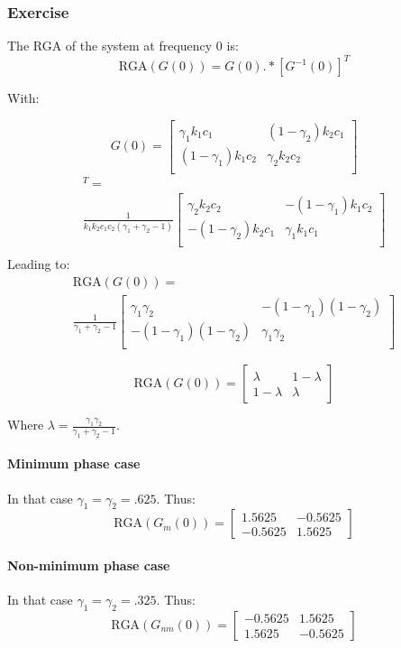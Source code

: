 \subsubsection{Exercise} 

The RGA of the system at frequency 0 is:
$$
\text{RGA}(G(0)) = G(0).\ast[G^{-1}(0)]^T 
$$

With:

\begin{equation*}
    G(0) =
\left[
    \begin{array}{cc}
        \gamma_1k_1c_1 & (1-\gamma_2)k_2c_1 \\
        (1-\gamma_1)k_1c_2 & \gamma_2k_2c_2 \\
    \end{array}
\right]
\end{equation*}
\begin{multline*}
[G^{-1}(0)]^T = \\
\frac{1}{k_1k_2c_1c_2(\gamma_1+\gamma_2-1)}
\left[
    \begin{array}{cc}
        \gamma_2k_2c_2 & -(1-\gamma_1)k_1c_2 \\
        -(1-\gamma_2)k_2c_1 & \gamma_1k_1c_1 \\
    \end{array}
\right]\\
\end{multline*}
Leading to:
\begin{multline*}
    \text{RGA}(G(0)) =\\ 
\frac{1}{\gamma_1+\gamma_2-1}
\left[
    \begin{array}{cc}
        \gamma_1\gamma_2 & -(1-\gamma_1)(1-\gamma_2) \\
        -(1-\gamma_1)(1-\gamma_2) & \gamma_1\gamma_2 \\
    \end{array}
\right]
\end{multline*}

\begin{equation}
    \boxed{
    \text{RGA}(G(0)) =
    \left[
        \begin{array}{cc}
            \lambda & 1 - \lambda \\
            1 - \lambda & \lambda
        \end{array}
    \right]
}
\end{equation}

Where $\lambda = \frac{\gamma_1\gamma_2}{\gamma_1+\gamma_2-1}$.

\paragraph{Minimum phase case}
In that case $\gamma_1 = \gamma_2 = .625$. Thus:
$$
\text{RGA}(G_{m}(0)) =
    \left[
        \begin{array}{cc}
            1.5625 & -0.5625 \\
            -0.5625 & 1.5625
        \end{array}
    \right]
$$

\paragraph{Non-minimum phase case}
In that case $\gamma_1 = \gamma_2 = .325$. Thus:
$$
\text{RGA}(G_{nm}(0)) =
    \left[
        \begin{array}{cc}
            -0.5625 & 1.5625 \\
            1.5625 & -0.5625
        \end{array}
    \right]
$$
